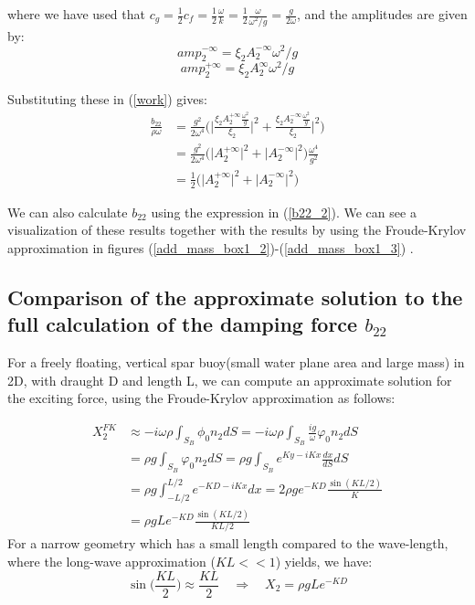\documentclass[a4paper,10pt]{article}
\begin{document}
where we have used that $c_g = \frac{1}{2}c_f = \frac{1}{2} \frac{\omega}{k} = \frac{1}{2} \frac{\omega}{\omega^2 / g} = \frac{g}{2 \omega}$, and the amplitudes are given by:
$${amp}_2^{- \infty} = \xi_2 A_2^{-\infty} \omega^2 / g $$
$${amp}_2^{+ \infty} = \xi_2 A_2^{\infty} \omega^2 / g $$

Substituting these in (\ref{work}) gives:
\begin{align}
\frac{b_{22}}{\rho \omega} &= \frac{g^2}{2 \omega^4} \Bigg( \bigg\vert \frac{\xi_2 A_2^{+\infty} \frac{\omega^2}{g}}{\xi_2} \bigg\vert^2 + \frac{\xi_2 A_2^{-\infty} \frac{\omega^2}{g}}{\xi_2} \bigg\vert^2 \Bigg)\\
&= \frac{g^2}{2 \omega^4} \bigg( \big\vert A_2^{+ \infty} \big\vert^2 + \big\vert A_2^{- \infty} \big\vert^2 \bigg) \frac{\omega^4}{g^2}\\
&= \frac{1}{2} \Big( \big\vert A_2^{+ \infty} \big\vert^2 + \big\vert A_2^{- \infty} \big\vert^2 \Big) \label{b22_2}
\end{align}

We can also calculate $b_{22}$ using the expression in (\ref{b22_2}). We can see a visualization of these results together with the results by using the Froude-Krylov approximation in figures (\ref{add_mass_box1_2})-(\ref{add_mass_box1_3}) .


\subsection{Comparison of the approximate solution to the full calculation of the damping force $b_{22}$}
For a freely floating, vertical spar buoy(small water plane area and large mass) in 2D, with draught D and length L, we can compute an approximate solution for the exciting force, using the Froude-Krylov approximation as follows:

\begin{align}
X_2^{FK} &\approx -i \omega \rho \int_{S_B} \phi_0 n_2 dS = -i \omega \rho \int_{S_B} \frac{i g}{\omega} \varphi_0 n_2 dS \nonumber\\[0.5 em]
&= \rho g \int_{S_B} \varphi_0 n_2 dS = \rho g \int_{S_B} e^{Ky - iKx}  \frac{dx}{dS} dS \nonumber\\[0.5 em]
&= \rho g \int_{-L/2}^{L/2} e^{-KD - iKx} dx = 2 \rho g e^{-KD}\frac{\sin(KL/2)}{K}\nonumber\\
&=\rho g L e^{-KD} \frac{\sin(KL/2)}{KL/2} \label{FK}
\end{align}
For a narrow geometry which has a small length compared to the wave-length, where the long-wave approximation ($KL<<1$) yields, we have:
\begin{equation}
\sin\Big(\frac{KL}{2}\Big) \approx \frac{KL}{2} \quad \Rightarrow \quad X_2 = \rho g L e^{-KD}
\end{equation}
\end{document}
